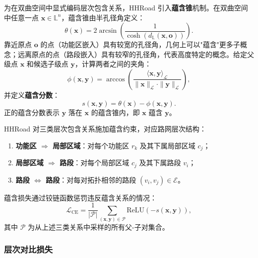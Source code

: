为在双曲空间中显式编码层次包含关系，HHRoad 引入\textbf{蕴含锥}机制\cite{ganea2018hyperbolic}。在双曲空间中任意一点 $\mathbf{x} \in \mathbb{L}^n$，蕴含锥由半孔径角定义：
\begin{equation}
    \theta(\mathbf{x}) = 2\arcsin\!\left(\frac{1}{\cosh\!\left(d_{\mathbb{L}}(\mathbf{x}, \mathbf{o})\right)}\right).
    \label{eq:aperture}
\end{equation}
靠近原点 $\mathbf{o}$ 的点（功能区嵌入）具有较宽的孔径角，几何上可以"蕴含"更多子概念；远离原点的点（路段嵌入）具有较窄的孔径角，代表高度特定的概念。给定父级点 $\mathbf{x}$ 和候选子级点 $\mathbf{y}$，计算两者之间的夹角：
\begin{equation}
    \phi(\mathbf{x}, \mathbf{y}) = \arccos\!\left(
      \frac{\langle \mathbf{x}, \mathbf{y} \rangle_{\mathcal{L}}}
           {\|\mathbf{x}\|_{\mathcal{L}} \cdot \|\mathbf{y}\|_{\mathcal{L}}}
    \right),
    \label{eq:angle}
\end{equation}
并定义\textbf{蕴含分数}：
\begin{equation}
    s(\mathbf{x}, \mathbf{y}) = \theta(\mathbf{x}) - \phi(\mathbf{x}, \mathbf{y}).
    \label{eq:entail_score}
\end{equation}
正的蕴含分数表示 $\mathbf{y}$ 落在 $\mathbf{x}$ 的蕴含锥内，即 $\mathbf{x}$ 蕴含 $\mathbf{y}$。

HHRoad 对三类层次包含关系施加蕴含约束，对应路网层次结构：
\begin{enumerate}[leftmargin=*,itemsep=2pt]
    \item \textbf{功能区 $\Rightarrow$ 局部区域}：对每个功能区 $r_k$ 及其下属局部区域 $c_j$；
    \item \textbf{局部区域 $\Rightarrow$ 路段}：对每个局部区域 $c_j$ 及其下属路段 $v_i$；
    \item \textbf{路段 $\Leftrightarrow$ 路段}：对每对拓扑相邻的路段 $(v_i, v_j) \in \mathcal{E}$。
\end{enumerate}
蕴含损失通过铰链函数惩罚违反蕴含关系的情况：
\begin{equation}
    \mathcal{L}_{\text{CE}} = \frac{1}{|\mathcal{P}|}
    \sum_{(\mathbf{x}, \mathbf{y}) \in \mathcal{P}}
    \text{ReLU}\!\left(-s(\mathbf{x}, \mathbf{y})\right),
    \label{eq:loss_ce}
\end{equation}
其中 $\mathcal{P}$ 为从上述三类关系中采样的所有父-子对集合。

\subsubsection{层次对比损失}

